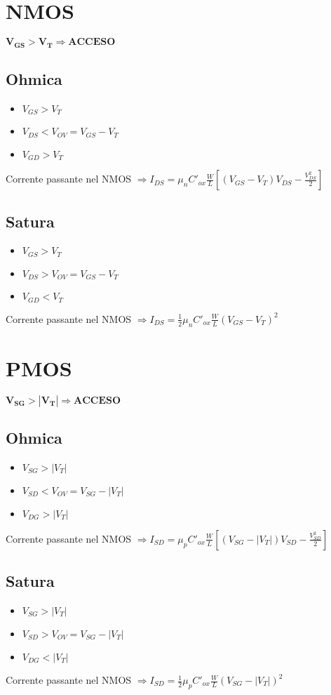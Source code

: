 \documentclass[12pt, letterpaper]{article}
\begin{document}
\section{NMOS}
$\mathbf{V_{GS} > V_T \Rightarrow ACCESO}$

\subsection{Ohmica}
\begin{itemize}
    \item $V_{GS} > V_T$
    \item $V_{DS} < V_{OV} = V_{GS} - V_T$
    \item $V_{GD} > V_T$
\end{itemize}

Corrente passante nel NMOS $\Rightarrow I_{DS} = \mu_nC'_{ox}\frac{W}{L}\left[\left(V_{GS}-V_T\right)V_{DS}-\frac{V_{DS}^2}{2}\right]$

\subsection{Satura}
\begin{itemize}
    \item $V_{GS} > V_T$
    \item $V_{DS} > V_{OV} = V_{GS} - V_T$
    \item $V_{GD} < V_T$
\end{itemize}

Corrente passante nel NMOS $\Rightarrow I_{DS}=\frac{1}{2}\mu_nC'_{ox}\frac{W}{L}\left(V_{GS}-V_T\right)^2$

\newpage
\section{PMOS}
$\mathbf{V_{SG} > \left|V_T\right| \Rightarrow ACCESO}$

\subsection{Ohmica}
\begin{itemize}
    \item $V_{SG} > |V_T|$
    \item $V_{SD} < V_{OV} = V_{SG} - |V_T|$
    \item $V_{DG} > |V_T|$
\end{itemize}

Corrente passante nel NMOS $\Rightarrow I_{SD} = \mu_pC'_{ox}\frac{W}{L}\left[\left(V_{SG}-|V_T|\right)V_{SD}-\frac{V_{SD}^2}{2}\right]$

\subsection{Satura}
\begin{itemize}
    \item $V_{SG} > |V_T|$
    \item $V_{SD} > V_{OV} = V_{SG} - |V_T|$
    \item $V_{DG} < |V_T|$
\end{itemize}

Corrente passante nel NMOS $\Rightarrow I_{SD}=\frac{1}{2}\mu_pC'_{ox}\frac{W}{L}\left(V_{SG}-|V_T|\right)^2$
\end{document}
